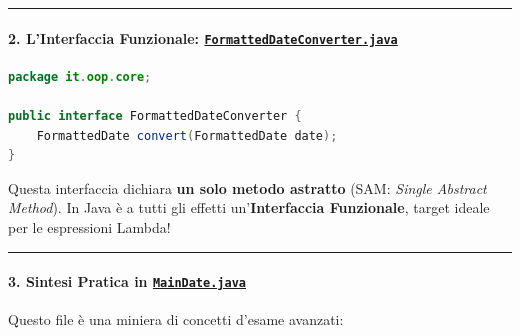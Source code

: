 \documentclass[11pt,a4paper]{article}
\begin{document}
\begin{center}\rule{0.5\linewidth}{0.5pt}\end{center}

\paragraph{\texorpdfstring{2. L'Interfaccia Funzionale:
\href{file:///home/wally/Documenti/GitHub/Programmazione-II/25-26/Teoria-e-Esercitazioni/Codice-20260902/Lezione13/MavenDate/src/main/java/it/oop/core/FormattedDateConverter.java}{\texttt{FormattedDateConverter.java}}}{2. L'Interfaccia Funzionale: FormattedDateConverter.java}}\label{linterfaccia-funzionale-formatteddateconverter.java}

\begin{lstlisting}[language=Java]
package it.oop.core;

public interface FormattedDateConverter {
    FormattedDate convert(FormattedDate date);
}
\end{lstlisting}

Questa interfaccia dichiara \textbf{un solo metodo astratto} (SAM:
\emph{Single Abstract Method}). In Java è a tutti gli effetti
un'\textbf{Interfaccia Funzionale}, target ideale per le espressioni
Lambda!

\begin{center}\rule{0.5\linewidth}{0.5pt}\end{center}

\paragraph{\texorpdfstring{3. Sintesi Pratica in
\href{file:///home/wally/Documenti/GitHub/Programmazione-II/25-26/Teoria-e-Esercitazioni/Codice-20260902/Lezione13/MavenDate/src/main/java/it/oop/ui/MainDate.java}{\texttt{MainDate.java}}}{3. Sintesi Pratica in MainDate.java}}\label{sintesi-pratica-in-maindate.java}

Questo file è una miniera di concetti d'esame avanzati:
\end{document}
